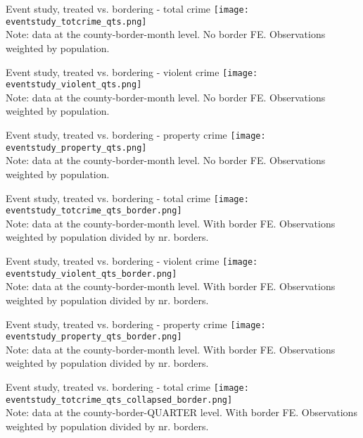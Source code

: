 \documentclass[xcolor=pdftex,dvipsnames,table]{beamer}
\begin{document}
\begin{frame}{Event study, treated vs. bordering - total crime}
\texttt{[image: eventstudy\_totcrime\_qts.png]}\\
\tiny{Note: data at the county-border-month level. No border FE. Observations weighted by population.}
\end{frame}

\begin{frame}{Event study, treated vs. bordering - violent crime}
\texttt{[image: eventstudy\_violent\_qts.png]}\\
\tiny{Note: data at the county-border-month level. No border FE. Observations weighted by population.}
\end{frame}

\begin{frame}{Event study, treated vs. bordering - property crime}
\texttt{[image: eventstudy\_property\_qts.png]}\\
\tiny{Note: data at the county-border-month level. No border FE. Observations weighted by population.}
\end{frame}

\begin{frame}{Event study, treated vs. bordering - total crime}
\texttt{[image: eventstudy\_totcrime\_qts\_border.png]}\\
\tiny{Note: data at the county-border-month level. With border FE. Observations weighted by population divided by nr. borders.}
\end{frame}

\begin{frame}{Event study, treated vs. bordering - violent crime}
\texttt{[image: eventstudy\_violent\_qts\_border.png]}\\
\tiny{Note: data at the county-border-month level. With border FE. Observations weighted by population divided by nr. borders.}
\end{frame}

\begin{frame}{Event study, treated vs. bordering - property crime}
\texttt{[image: eventstudy\_property\_qts\_border.png]}\\
\tiny{Note: data at the county-border-month level. With border FE. Observations weighted by population divided by nr. borders.}
\end{frame}


\begin{frame}{Event study, treated vs. bordering - total crime}
\texttt{[image: eventstudy\_totcrime\_qts\_collapsed\_border.png]}\\
\tiny{Note: data at the county-border-QUARTER level. With border FE. Observations weighted by population divided by nr. borders.}
\end{frame}
\end{document}
